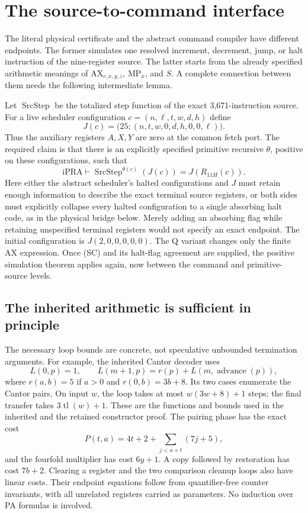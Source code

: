 \section{The source-to-command interface}
\label{sec:source-command-audit}

The literal physical certificate and the abstract command compiler have
different endpoints.  The former simulates one resolved increment,
decrement, jump, or halt instruction of the nine-register source.  The
latter starts from the already specified arithmetic meanings of
$\mathrm{AX}_{c,x,y,z}$, $\mathrm{MP}_x$, and $S$.  A complete connection
between them needs the following intermediate lemma.

Let $\operatorname{SrcStep}$ be the totalized step function of the exact
3,671-instruction source.  For a live scheduler configuration
$c=(n,\ell,t,w,d,h)$ define
\[
 J(c)=\bigl(25;(n,t,w,0,d,h,0,0,\ell)\bigr).
\]
Thus the auxiliary registers $A,X,Y$ are zero at the common fetch port.
The required claim is that there is an explicitly specified primitive
recursive $\theta$, positive on these configurations, such that
\[
 \mathrm{iPRA}\vdash
 \operatorname{SrcStep}^{\theta(c)}(J(c))=J(R_{11H}(c)).
 \tag{SC}
\]
Here either the abstract scheduler's halted configurations and $J$ must
retain enough information to describe the exact terminal source registers,
or both sides must explicitly collapse every halted configuration to a
single absorbing halt code, as in the physical bridge below. Merely
adding an absorbing flag while retaining unspecified terminal registers
would not specify an exact endpoint. The initial
configuration is $J(2,0,0,0,0,0)$.  The Q variant changes only the finite
AX expression.  Once (SC) and its halt-flag agreement are supplied, the
positive simulation theorem applies again, now between the command and
primitive-source levels.

\subsection{The inherited arithmetic is sufficient in principle}

The necessary loop bounds are concrete, not speculative unbounded
termination arguments.  For example, the inherited Cantor decoder uses
\[
 L(0,p)=1,\qquad L(m+1,p)=r(p)+L(m,\operatorname{advance}(p)),
\]
where $r(a,b)=5$ if $a>0$ and $r(0,b)=3b+8$.  Its two cases enumerate
the Cantor pairs.  On input $w$, the loop takes at most
$w(3w+8)+1$ steps; the final transfer takes $3\operatorname{tl}(w)+1$.
These are the functions and bounds used in the inherited
 and the retained constructor proof.
The pairing phase has the exact cost
\[
 P(t,a)=4t+2+\sum_{j<a+t}(7j+5),
\]
and the fourfold multiplier has cost $6y+1$.  A copy followed by restoration
has cost $7b+2$.  Clearing a register and the two comparison cleanup
loops also have linear costs.  Their endpoint equations follow from
quantifier-free counter invariants, with all unrelated registers carried
as parameters.  No induction over PA formulas is involved.


